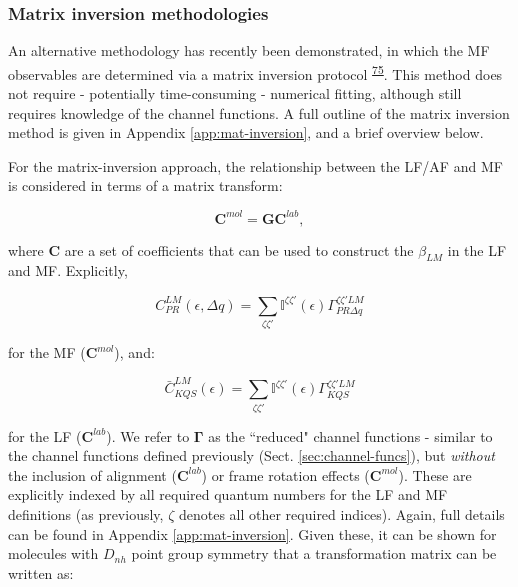 \documentclass[10pt]{article}
\begin{document}
\subsubsection{Matrix inversion methodologies\label{sec:matrix-inv-intro}}

An alternative methodology has recently been demonstrated, in which the MF observables are determined via a matrix inversion protocol \textsuperscript{\hyperref[csl:75]{75}}. This method does not require - potentially time-consuming - numerical fitting, although still requires knowledge of the channel functions. A full outline of the matrix inversion method is given in Appendix \ref{app:mat-inversion}, and a brief overview below.

For the matrix-inversion approach, the relationship between the LF/AF and MF is considered in terms of a matrix transform:

\begin{equation}
\mathbf{C}^{mol}=\mathbf{G}\mathbf{C}^{lab},\label{eq:basic}
\end{equation}

where $\mathbf{C}$ are a set of coefficients that can be used to construct the $\beta_{LM}$ in the LF and MF. Explicitly, 


\begin{equation}
C_{PR}^{LM}(\epsilon,\Delta q)=\sum_{\zeta\zeta'}\mathbb{I}^{\zeta\zeta'}(\epsilon)\Gamma_{PR\Delta q}^{\zeta\zeta'LM}
\end{equation}

for the MF ($\mathbf{C}^{mol}$), and:

\begin{equation}
\bar{C}_{KQS}^{LM}(\epsilon)=\sum_{\zeta\zeta'}\mathbb{I}^{\zeta\zeta'}(\epsilon)\Gamma_{KQS}^{\zeta\zeta'LM}
\label{eq:C-AF}
\end{equation}

for the LF ($\mathbf{C}^{lab}$). We refer to $\mathbf{\Gamma}$ as the ``reduced" channel functions - similar to the channel functions defined previously (Sect. \ref{sec:channel-funcs}), but \textit{without} the inclusion of alignment ($\mathbf{C}^{lab}$) or frame rotation effects ($\mathbf{C}^{mol}$). These are explicitly indexed by all required quantum numbers for the LF and MF definitions (as previously, $\zeta$ denotes all other required indices). Again, full details can be found in Appendix \ref{app:mat-inversion}. Given these, it can be shown for molecules with $D_{nh}$ point group symmetry that a transformation matrix can be written as:
\end{document}
